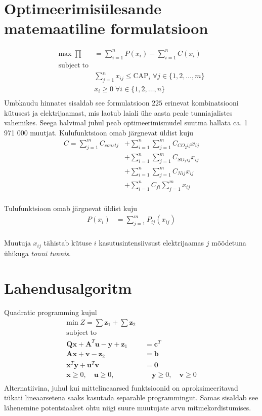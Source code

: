 \documentclass[twosided, 11pt, a4paper]{article}
\begin{document}
\section{Optimeerimis\"ulesande matemaatiline formulatsioon}
\begin{align}
\mathrm{max}\; \prod &= \sum_{i=1}^n P(x_i) - \sum_{i=1}^n C(x_i)\nonumber\\
\mathrm{subject \; to} &\nonumber \\
&\sum_{j=1}^n x_{ij} \le\mathrm{CAP}_i \; \forall j \in \{1,2,\dots,m\}\nonumber \\
&x_i \ge 0 \; \forall i \in \{1,2, \dots ,n\} \nonumber \\
\nonumber
\end{align}
Umbkaudu hinnates sisaldab see formulatsioon $225$ erinevat kombinatsiooni k\"utusest ja elektrijaamast, mis laotub laiali \"uhe aasta peale tunniajalistes vahemikes. Seega halvimal juhul peab optimeerimismudel suutma hallata ca. 1 971 000 muutjat.
Kulufunktsioon omab j\"argnevat \"uldist kuju
\begin{align}
C = \sum_{j=1}^m C_{const j} &+ \sum_{i=1}^n\sum_{j=1}^m C_{CO_2 ij}x_{ij} \nonumber \\
& + \sum_{i=1}^n\sum_{j=1}^m C_{SO_x ij}x_{ij} \nonumber \\
& + \sum_{i=1}^n\sum_{j=1}^m C_{N ij}x_{ij} \nonumber \\
& + \sum_{i=1}^n C_{f i}\sum_{j=1}^m x_{ij} \nonumber \\
\nonumber
\end{align}

Tulufunktsioon omab j\"argnevat \"uldist kuju
\begin{align}
P(x_i) &= \sum_{j=1}^m P_{ij}(x_{ij})\nonumber \\
\nonumber
\end{align}

Muutuja $x_{ij}$ t\"ahistab k\"utuse $i$ kasutusintensiivsust elektrijaamas $j$ m\~o\~odetuna \"uhikuga \emph{tonni tunnis}.
\section {Lahendusalgoritm}
Quadratic programming kujul
\begin{align}
\mathrm{min}\; Z = \sum\mathbf{z}_1 + \sum\mathbf{z}_2 &\nonumber \\
\mathrm{subject \; to}\qquad \qquad\qquad  &\nonumber\\
\mathbf{Qx} + \mathbf{A}^T\mathbf{u} - \mathbf{y} + \mathbf{z}_1 &= \mathbf{c}^T \nonumber\\
\mathbf{Ax} + \mathbf{v} - \mathbf{z}_2 &= \mathbf{b} \nonumber \\
\mathbf{x}^T\mathbf{y} + \mathbf{u}^T\mathbf{v} &= \mathbf{0} \nonumber \\
\mathbf{x} \ge 0, \quad\mathbf{u} \ge 0, & \quad\mathbf{y} \ge 0, \quad\mathbf{v} \ge 0 \nonumber \\
\nonumber
\end{align}
Alternatiivina, juhul kui mittelineaarsed funktsioonid on aproksimeeritavad t\"ukati lineaarsetena saaks kasutada separable programmingut. Samas sisaldab see l\"ahenemine potentsiaalset ohtu niigi suure muutujate arvu mitmekordistumises.
\end{document}
